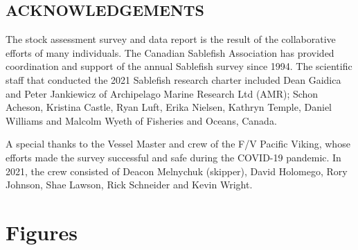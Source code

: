 \documentclass[12pt]{article}\usepackage[]{graphicx}\usepackage[]{color}
\begin{document}
\hypertarget{acknowledgements}{%
\subsection{ACKNOWLEDGEMENTS}\label{acknowledgements}}

The stock assessment survey and data report is the result of the collaborative efforts of many individuals. The Canadian Sablefish Association has provided coordination and support of the annual Sablefish survey since 1994. The scientific staff that conducted the 2021 Sablefish research charter included Dean Gaidica and Peter Jankiewicz of Archipelago Marine Research Ltd (AMR); Schon Acheson, Kristina Castle, Ryan Luft, Erika Nielsen, Kathryn Temple, Daniel Williams and Malcolm Wyeth of Fisheries and Oceans, Canada.

A special thanks to the Vessel Master and crew of the F/V Pacific Viking, whose efforts made the survey successful and safe during the COVID-19 pandemic. In 2021, the crew consisted of Deacon Melnychuk (skipper), David Holomego, Rory Johnson, Shae Lawson, Rick Schneider and Kevin Wright.

\clearpage

\hypertarget{figures}{%
\section{Figures}\label{figures}}
\end{document}
